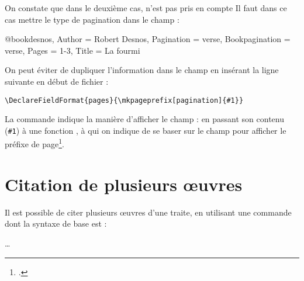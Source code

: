 
\begin{quotation}
\cite[2]{desnos}

\cite{desnos}
\end{quotation}


On constate que dans le deuxième cas,  n'est pas pris en compte
Il faut dans ce cas mettre le type de pagination dans le champ  :

\begin{latexcode}
@book{desnos,
    Author = {Robert Desnos},
    Pagination = {verse},
    Bookpagination = {verse},
    Pages = {1-3},
    Title = {La fourmi}}
\end{latexcode}

\begin{quotation}
\cite[2]{desnos}

\cite{desnos}
\end{quotation}


\begin{plusloins}
On peut éviter de dupliquer l'information dans le champ  en insérant la ligne suivante en début de fichier  :

\begin{verbatim}
\DeclareFieldFormat{pages}{\mkpageprefix[pagination]{#1}}
\end{verbatim}

La commande  indique la manière d'afficher le champ  : en passant son contenu (\verb|#1|) à une fonction , à qui on indique de se baser sur le champ  pour afficher le préfixe de page\footcite[Voir][]{biblatex_formating}.

\end{plusloins}

\section{Citation de plusieurs œuvres}\label{citemultiple}

Il est possible de citer plusieurs œuvres d'une traite, en  utilisant une commande dont la syntaxe de base est :

  …

